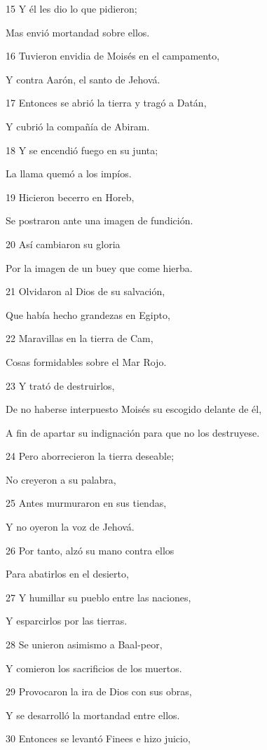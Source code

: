\par 15 Y él les dio lo que pidieron;
\par Mas envió mortandad sobre ellos.
\par 16 Tuvieron envidia de Moisés en el campamento,
\par Y contra Aarón, el santo de Jehová.
\par 17 Entonces se abrió la tierra y tragó a Datán,
\par Y cubrió la compañía de Abiram.
\par 18 Y se encendió fuego en su junta;
\par La llama quemó a los impíos.
\par 19 Hicieron becerro en Horeb,
\par Se postraron ante una imagen de fundición.
\par 20 Así cambiaron su gloria
\par Por la imagen de un buey que come hierba.
\par 21 Olvidaron al Dios de su salvación,
\par Que había hecho grandezas en Egipto,
\par 22 Maravillas en la tierra de Cam,
\par Cosas formidables sobre el Mar Rojo.
\par 23 Y trató de destruirlos,
\par De no haberse interpuesto Moisés su escogido delante de él,
\par A fin de apartar su indignación para que no los destruyese.
\par 24 Pero aborrecieron la tierra deseable;
\par No creyeron a su palabra,
\par 25 Antes murmuraron en sus tiendas,
\par Y no oyeron la voz de Jehová.
\par 26 Por tanto, alzó su mano contra ellos
\par Para abatirlos en el desierto,
\par 27 Y humillar su pueblo entre las naciones,
\par Y esparcirlos por las tierras.
\par 28 Se unieron asimismo a Baal-peor,
\par Y comieron los sacrificios de los muertos.
\par 29 Provocaron la ira de Dios con sus obras,
\par Y se desarrolló la mortandad entre ellos.
\par 30 Entonces se levantó Finees e hizo juicio,
